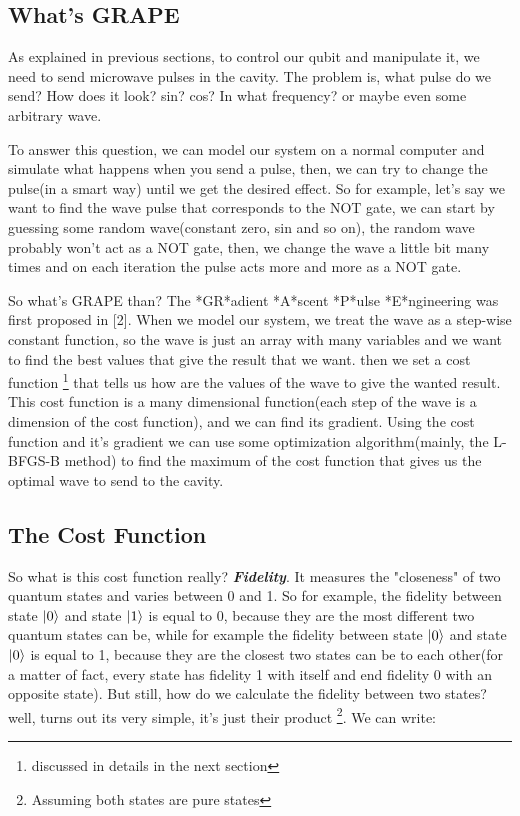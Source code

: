 \documentclass[english, a4paper, 12pt, twoside]{article}
\numberwithin{equation}{section} %
\begin{document}
\subsection{What's GRAPE} %
As explained in previous sections, to control our qubit and manipulate it, we need to send microwave pulses in the cavity. The problem is, what pulse do we send? How does it look? sin? cos? In what frequency? or maybe even some arbitrary wave. \par
To answer this question, we can model our system on a normal computer and simulate what happens when you send a pulse, then, we can try to change the pulse(in a smart way) until we get the desired effect. So for example, let's say we want to find the wave pulse that corresponds to the NOT gate, we can start by guessing some random wave(constant zero, sin and so on), the random wave probably won't act as a NOT gate, then, we change the wave a little bit many times and on each iteration the pulse acts more and more as a NOT gate.\par
So what's GRAPE than? The *GR*adient *A*scent *P*ulse *E*ngineering was first proposed in [2]. When we model our system, we treat the wave as a step-wise constant function, so the wave is just an array with many variables and we want to find the best values that give the result that we want. then we set a cost function \footnote{discussed in details in the next section} that tells us how are the values of the wave to give the wanted result. This cost function is a many dimensional function(each step of the wave is a dimension of the cost function), and we can find its gradient. Using the cost function and it's gradient we can use some optimization algorithm(mainly, the L-BFGS-B method) to find the maximum of the cost function that gives us the optimal wave to send to the cavity.

\subsection{The Cost Function}
So what is this cost function really? \textit{\textbf{Fidelity}}. It measures the "closeness" of two quantum states and varies between 0 and 1. So for example, the fidelity between state $\ket{0}$ and state $\ket{1}$ is equal to 0, because they are the most different two quantum states can be, while for example the fidelity between state $\ket{0}$ and state $\ket{0}$ is equal to 1, because they are the closest two states can be to each other(for a matter of fact, every state has fidelity 1 with itself and end fidelity 0 with an opposite state). But still, how do we calculate the fidelity between two states? well, turns out its very simple, it's just their product \footnote{Assuming both states are pure states}. We can write:
\end{document}
